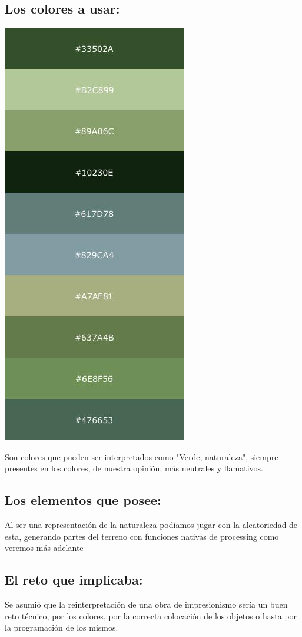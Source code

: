 \documentclass[11pt,a4paper]{article}
\begin{document}
	\subsection{Los colores a usar: }
		\begin{center}
			\includegraphics[scale=.3]{PaletaDeColores}
		\end{center}
			Son colores que pueden ser interpretados como "Verde, naturaleza", siempre presentes en los colores, de nuestra 	opinión, más neutrales y llamativos.
	\subsection{Los elementos que posee:}
		Al ser una representación de la naturaleza podíamos jugar con la aleatoriedad de esta, generando partes del terreno con funciones nativas de processing como veremos más adelante
	\subsection{El reto que implicaba: }
		Se asumió que la reinterpretación de una obra de impresionismo sería un buen reto técnico, por los colores, por la correcta colocación de los objetos o hasta por la programación de los mismos.
\end{document}
